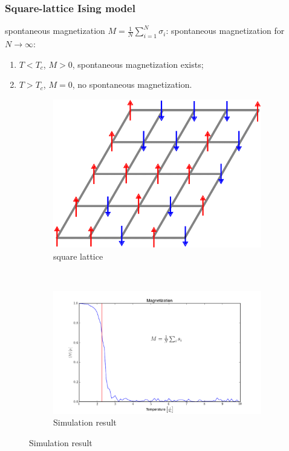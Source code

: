 \documentclass[notheorems]{beamer}
\begin{document}
\begin{frame}
\frametitle{Square-lattice Ising model}	
\begin{block}{spontaneous magnetization}
	$M = \frac{1}{N} \sum_{i=1}^N \sigma_i$: spontaneous magnetization for $N\to \infty$:
	\begin{enumerate}
		\item $T< T_c$, $M>0$, spontaneous magnetization exists;
		\item $T> T_c$, $M=0$, no spontaneous magnetization.
	\end{enumerate}
\end{block}
\begin{figure}
	\centering
	\begin{subfigure}{0.45\textwidth}
		\includegraphics[width=\textwidth]{square-lattice.png}
		\caption{square lattice}
	\end{subfigure}~
	\begin{subfigure}{0.53\textwidth}
		\includegraphics[width=\textwidth]{monte-carlo-ising-6.png}
		\caption{Simulation result}
	\end{subfigure}
\end{figure}

\end{frame}
\end{document}
